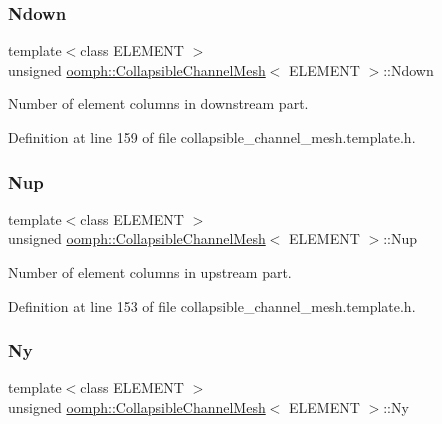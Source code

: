 \subsubsection{\texorpdfstring{Ndown}{Ndown}}
{\footnotesize\ttfamily template$<$class E\+L\+E\+M\+E\+NT $>$ \\
unsigned \hyperlink{classoomph_1_1CollapsibleChannelMesh}{oomph\+::\+Collapsible\+Channel\+Mesh}$<$ E\+L\+E\+M\+E\+NT $>$\+::Ndown\hspace{0.3cm}{\ttfamily [protected]}}



Number of element columns in downstream part. 



Definition at line 159 of file collapsible\+\_\+channel\+\_\+mesh.\+template.\+h.

\mbox{\label{classoomph_1_1CollapsibleChannelMesh_aafd1c6d21bb891f1188ba6eed1705a45}} 
\subsubsection{\texorpdfstring{Nup}{Nup}}
{\footnotesize\ttfamily template$<$class E\+L\+E\+M\+E\+NT $>$ \\
unsigned \hyperlink{classoomph_1_1CollapsibleChannelMesh}{oomph\+::\+Collapsible\+Channel\+Mesh}$<$ E\+L\+E\+M\+E\+NT $>$\+::Nup\hspace{0.3cm}{\ttfamily [protected]}}



Number of element columns in upstream part. 



Definition at line 153 of file collapsible\+\_\+channel\+\_\+mesh.\+template.\+h.

\mbox{\label{classoomph_1_1CollapsibleChannelMesh_afa8d1dceef1cafeb166794d9275a30a3}} 
\subsubsection{\texorpdfstring{Ny}{Ny}}
{\footnotesize\ttfamily template$<$class E\+L\+E\+M\+E\+NT $>$ \\
unsigned \hyperlink{classoomph_1_1CollapsibleChannelMesh}{oomph\+::\+Collapsible\+Channel\+Mesh}$<$ E\+L\+E\+M\+E\+NT $>$\+::Ny\hspace{0.3cm}{\ttfamily [protected]}}



